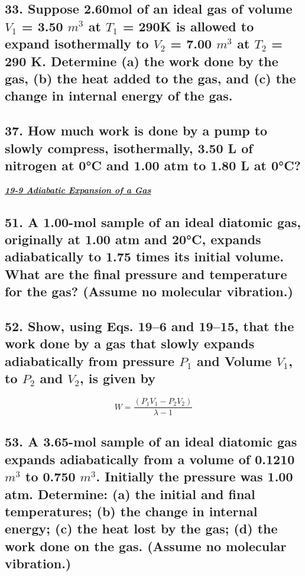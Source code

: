\documentclass{article}
\begin{document}
    \subsection*{33. Suppose 2.60mol of an ideal gas of volume $V_1$ = 3.50 $m^3$ at $T_1$ = 290K is allowed to expand isothermally to $V_2$ = 7.00 $m^3$ at $T_2$ = 290 K. Determine (a) the work done by the gas, (b) the heat added to the gas, and (c) the change in internal energy of the gas.}
    \vspace{3in}
    \subsection*{37. How much work is done by a pump to slowly compress, isothermally, 3.50 L of nitrogen at 0°C and 1.00 atm to 1.80 L at 0°C?}
    \newpage
    \noindent \large{\textbf{\textit{\underline{19-9 Adiabatic Expansion of a Gas}}}} \\
    \subsection*{51. A 1.00-mol sample of an ideal diatomic gas, originally at 1.00 atm and 20°C, expands adiabatically to 1.75 times its initial volume. What are the final pressure and temperature for the gas? (Assume no molecular vibration.)}
    \vspace{4in}
    \subsection*{52. Show, using Eqs. 19–6 and 19–15, that the work done by a gas that slowly expands adiabatically from pressure $P_1$ and Volume $V_1$, to $P_2$ and $V_2$, is given by}
    \[
        W = \displaystyle\frac{(P_1V_1 - P_2V_2)}{\lambda - 1}
    \]
    \newpage
    \subsection*{53. A 3.65-mol sample of an ideal diatomic gas expands adiabatically from a volume of 0.1210 $m^3$ to 0.750 $m^3$. Initially the pressure was 1.00 atm. Determine: (a) the initial and final temperatures; (b) the change in internal energy; (c) the heat lost by the gas; (d) the work done on the gas. (Assume no molecular vibration.)}
\end{document}
